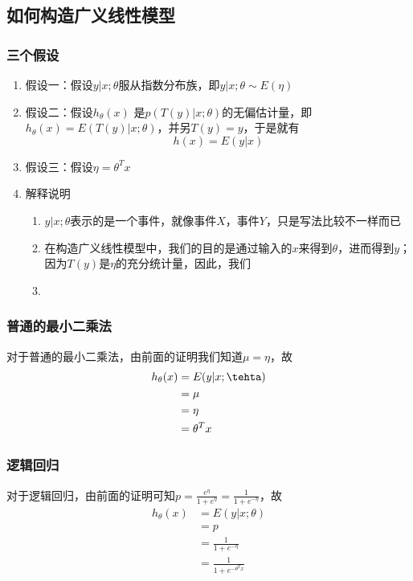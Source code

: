 \subsection{如何构造广义线性模型}
\subsubsection{三个假设}
\begin{enumerate}
	\item 假设一：假设$y|x; \theta$服从指数分布族，即$y|x; \theta \sim E(\eta)$
	\item 假设二：假设$h_\theta(x)$ 是$p\left(T(y)|x; \theta\right)$的无偏估计量，即$h_\theta(x)=E\left(T(y)|x; \theta\right)$，并另$T(y)=y$，于是就有
	\begin{equation}
		h(x) = E(y|x)
	\end{equation}
	{\color{red}{对此条假设还待更进一步的理解}}
	\item 假设三：假设$\eta = \theta^Tx$
	\item 解释说明
	\begin{enumerate}
		\item $y|x; \theta$表示的是一个事件，就像事件$X$，事件$Y$，只是写法比较不一样而已
		\item 在构造广义线性模型中，我们的目的是通过输入的$x$来得到$\theta$，进而得到$y$；因为$T(y)$是$\eta$的充分统计量，因此，我们
		\item 
	\end{enumerate}

\end{enumerate}
\subsubsection{普通的最小二乘法}
对于普通的最小二乘法，由前面的证明我们知道$\mu = \eta$，故
\begin{align}
	h_\theta(x) &= E(y|x;\tehta) \\
	&= \mu \\
	&= \eta \\
	&= \theta^T x
\end{align}


\subsubsection{逻辑回归}
对于逻辑回归，由前面的证明可知$p=\frac{e^{\eta}}{1+e^{\eta}} = \frac{1}{1+e^{-\eta}}$，故
\begin{align}
	h_\theta(x) &= E(y|x; \theta) \\
	&= p \\
	&= \frac{1}{1+e^{-\eta}} \\
	&= \frac{1}{1+e^{-\theta^Tx}}
\end{align}




% 




















